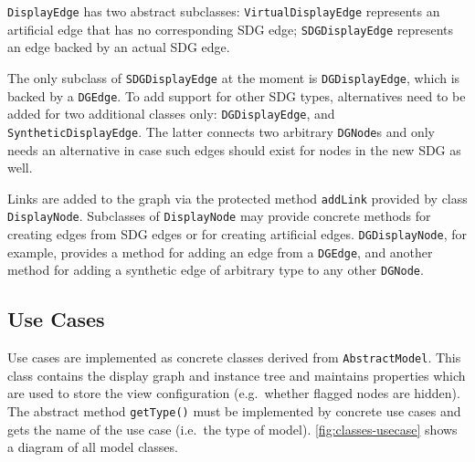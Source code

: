 \lstinline|DisplayEdge| has two abstract subclasses: \lstinline|VirtualDisplayEdge| represents an artificial edge that 
has no corresponding SDG edge; \lstinline|SDGDisplayEdge| represents an edge backed by an actual SDG edge.

The only subclass of \lstinline|SDGDisplayEdge| at the moment is \lstinline|DGDisplayEdge|, which is backed by a 
\lstinline|DGEdge|. To add support for other SDG types, alternatives need to be added for two additional classes 
only: \lstinline|DGDisplayEdge|, and \lstinline|SyntheticDisplayEdge|. The latter connects two arbitrary 
\lstinline|DGNode|s and only needs an alternative in case such edges should exist for nodes in the new SDG as well.

Links are added to the graph via the protected method \lstinline|addLink| provided by class \lstinline|DisplayNode|. 
Subclasses of \lstinline|DisplayNode| may provide concrete methods for creating edges from SDG edges or for creating 
artificial edges. \lstinline|DGDisplayNode|, for example, provides a method for adding an edge from a 
\lstinline|DGEdge|, and another method for adding a synthetic edge of arbitrary type to any other \lstinline|DGNode|.

\subsection{Use Cases}

Use cases are implemented as concrete classes derived from \lstinline|AbstractModel|. This class contains the display 
graph and instance tree and maintains properties which are used to store the view configuration (e.g.\ whether flagged 
nodes are hidden). The abstract method \lstinline|getType()| must be implemented by concrete use cases and gets the 
name of the use case (i.e.\ the type of model). \autoref{fig:classes-usecase} shows a diagram of all model classes.


